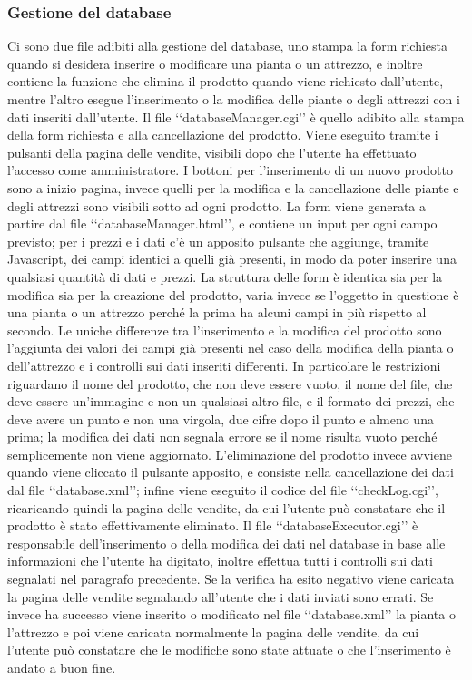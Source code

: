{{		\subsubsection{Gestione del database}
			Ci sono due file adibiti alla gestione del database, uno stampa la form richiesta quando si desidera inserire o modificare una pianta o un attrezzo, e inoltre contiene la funzione che elimina il prodotto quando viene richiesto dall'utente, mentre l'altro esegue l'inserimento o la modifica delle piante o degli attrezzi con i dati inseriti dall'utente.
			Il file ‘‘databaseManager.cgi’’ è quello adibito alla stampa della form richiesta e alla cancellazione del prodotto. Viene eseguito tramite i pulsanti della pagina delle vendite, visibili dopo che l'utente ha effettuato l'accesso come amministratore. I bottoni per l'inserimento di un nuovo prodotto sono a inizio pagina, invece quelli per la modifica e la cancellazione delle piante e degli attrezzi sono visibili sotto ad ogni prodotto. La form viene generata a partire dal file ‘‘databaseManager.html’’, e contiene un input per ogni campo previsto; per i prezzi e i dati c'è un apposito pulsante che aggiunge, tramite Javascript, dei campi identici a quelli già presenti, in modo da poter inserire una qualsiasi quantità di dati e prezzi. La struttura delle form è identica sia per la modifica sia per la creazione del prodotto, varia invece se l'oggetto in questione è una pianta o un attrezzo perché la prima ha alcuni campi in più rispetto al secondo. Le uniche differenze tra l'inserimento e la modifica del prodotto sono l'aggiunta dei valori dei campi già presenti nel caso della modifica della pianta o dell'attrezzo e i controlli sui dati inseriti differenti. In particolare le restrizioni riguardano il nome del prodotto, che non deve essere vuoto, il nome del file, che deve essere un'immagine e non un qualsiasi altro file, e il formato dei prezzi, che deve avere un punto e non una virgola, due cifre dopo il punto e almeno una prima; la modifica dei dati non segnala errore se il nome risulta vuoto perché semplicemente non viene aggiornato. L'eliminazione del prodotto invece avviene quando viene cliccato il pulsante apposito, e consiste nella cancellazione dei dati dal file ‘‘database.xml’’; infine viene eseguito il codice del file ‘‘checkLog.cgi’’, ricaricando quindi la pagina delle vendite, da cui l'utente può constatare che il prodotto è stato effettivamente eliminato.
			Il file ‘‘databaseExecutor.cgi’’ è responsabile dell'inserimento o della modifica dei dati nel database in base alle informazioni che l'utente ha digitato, inoltre effettua tutti i controlli sui dati segnalati nel paragrafo precedente. Se la verifica ha esito negativo viene caricata la pagina delle vendite segnalando all'utente che i dati inviati sono errati. Se invece ha successo viene inserito o modificato nel file ‘‘database.xml’’ la pianta o l'attrezzo e poi viene caricata normalmente la pagina delle vendite, da cui l'utente può constatare che le modifiche sono state attuate o che l'inserimento è andato a buon fine.
	}
}